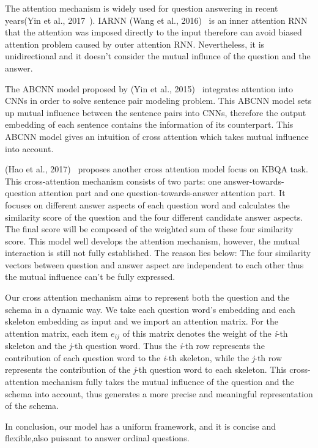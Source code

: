 The attention mechanism is widely used for question answering in recent years(Yin et al., 2017~\cite{yin2017type}). IARNN (Wang et al., 2016)~\cite{wang2016inner} is an inner attention RNN that the attention was imposed directly to the input therefore can avoid biased attention problem caused by outer attention RNN. Nevertheless, it is unidirectional  and it doesn't consider the mutual influnce of the question and the answer.
 
The ABCNN model proposed by (Yin et al., 2015)~\cite{yin2015abcnn} integrates attention into CNNs in order to solve sentence pair modeling problem. This ABCNN model sets up mutual influence between the sentence pairs into CNNs, therefore the output embedding of each sentence contains the information of its counterpart. This ABCNN model gives an intuition of cross attention which takes mutual influence into account.
 
(Hao et al., 2017)~\cite{hao2017end} proposes another cross attention model focus on KBQA task. This cross-attention mechanism consists of two parts: one answer-towards-question attention part and one question-towards-answer attention part. It focuses on different answer aspects of each question word and calculates the similarity score of the question and the four different candidate answer aspects. The final score will be composed of the weighted sum of these four similarity score. This model well develops the attention mechanism, however, the mutual interaction is still not fully established. The reason lies below:  The four similarity vectors between question and answer aspect are independent to each other thus the mutual influence can't be fully expressed. 
 
Our cross attention mechanism aims to represent both the question and the schema in a dynamic way. We take each question word's embedding and each skeleton embedding as input and we import an attention matrix. For the attention matrix, each item $e_{ij}$ of this matrix denotes the weight of the \emph{i}-th skeleton and the \emph{j}-th question word. Thus the \emph{i}-th row represents the contribution of each question word to the \emph{i}-th skeleton, while the \emph{j}-th row represents the contribution of the \emph{j}-th question word to each skeleton. This cross-attention mechanism fully takes the mutual influence of the question and the schema into account, thus generates a more precise and meaningful representation of the schema. 

In conclusion, our model has a uniform framework, and it is concise and flexible,also puissant to answer ordinal questions.
